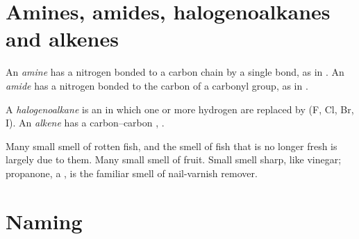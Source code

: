 \section{Amines, amides, halogenoalkanes and alkenes}


\begin{definition}\label{def:g11:functional-groups:amine}
An \emph{amine} has a nitrogen  bonded to a carbon chain
by a single bond, as in . An \emph{amide} has a nitrogen 
bonded to the carbon of a carbonyl group, as in .
\end{definition}

\begin{definition}\label{def:g11:functional-groups:halogenoalkane}
A \emph{halogenoalkane} is an  in which one
or more hydrogen  are replaced by   (F, Cl, Br, I). An
\emph{alkene} has a carbon--carbon , .
\end{definition}

\begin{remark}\label{rem:g11:functional-groups:smells}
Many small  smell of rotten fish, and the smell of fish that is no
longer fresh is largely due to them. Many small  smell of fruit.
Small  smell sharp, like vinegar; propanone, a ,
is the familiar  smell of nail-varnish remover.
\end{remark}

\section{Naming}

